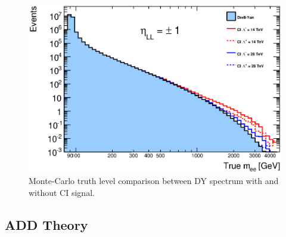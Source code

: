         \begin{figure}[h]
            \begin{center}
            \includegraphics[width=0.9\linewidth]{images/truth_mass_LL.eps}
            \end{center}
            \caption{Monte-Carlo truth level comparison between DY spectrum with and without CI signal.}
            \label{fig:theoryInvMass}
        \end{figure}

    

    \subsection{ADD Theory}
      \label{sec:ADD_T}

